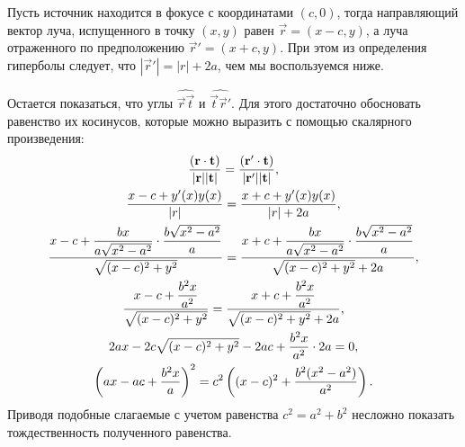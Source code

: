Пусть источник находится в фокусе с координатами $(c, 0)$, тогда направляющий вектор луча, испущенного в точку $(x, y)$ равен $\vec r = (x - c, y)$, а луча отраженного по предположению $\vec r' = (x + c, y)$. При этом из определения гиперболы следует, что $|\vec r'| = |r| + 2a$, чем мы воспользуемся ниже. 

Остается показаться, что углы $\widehat{\vec r \vec t}$ и $\widehat{\vec t \vec r'}$. Для этого достаточно обосновать равенство их косинусов, которые можно выразить с помощью скалярного произведения:
\begin{gather*}
	\frac{ \left(\mathbf{r} \cdot \mathbf{t}\right)}{|\mathbf{r}| | \mathbf{t} |} = \frac{ \left(\mathbf{r'} \cdot \mathbf{t}\right)}{|\mathbf{r}'| | \mathbf{t} |},\\
	\frac{ x - c + y'(x)y(x)}{|r|} = \frac{x + c + y'(x) y(x)}{|r| + 2a},\\
	\frac{ x - c + \dfrac{bx}{a \sqrt{x^2-a^2}} \cdot \dfrac{b\sqrt{x^2 - a^2}}{a}}{\sqrt{(x - c)^2 + y^2}} = \frac{ x + c + \dfrac{bx}{a \sqrt{x^2-a^2}} \cdot \dfrac{b\sqrt{x^2 - a^2}}{a}}{\sqrt{(x - c)^2 + y^2} + 2a},\\
	\frac{ x - c + \dfrac{b^2 x }{a^2}}{\sqrt{(x - c)^2 + y^2}} = \frac{ x + c + \dfrac{b^2 x }{a^2}}{\sqrt{(x - c)^2 + y^2} + 2a},\\
	2ax - 2c\sqrt{(x - c )^2 + y^2} - 2ac + \frac{b^2 x}{a^2} \cdot 2a = 0,\\
	\left( ax - ac + \frac{b^2 x}{a} \right)^2 = c^2 \left( (x-c)^2 + \frac{b^2 (x^2 - a^2)}{a^2} \right).
\end{gather*}
Приводя подобные слагаемые с учетом равенства $c^2 = a^2 + b^2$ несложно показать тождественность полученного равенства.

